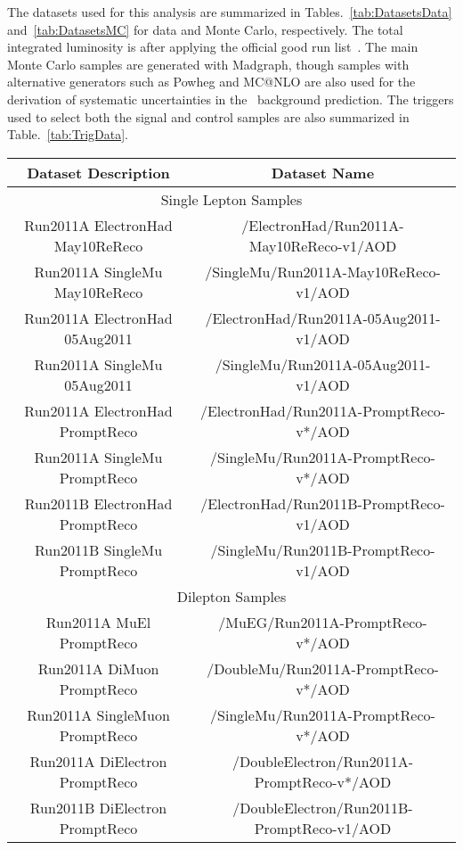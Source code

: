 
The datasets used for this analysis are summarized in 
Tables.~\ref{tab:DatasetsData} and~\ref{tab:DatasetsMC} for data and Monte 
Carlo, respectively. The total integrated luminosity is \lumi after
applying the official good run list~\cite{json}. The main Monte Carlo
samples are generated with Madgraph, though samples with
alternative generators such as Powheg and MC@NLO are also used for
the derivation of systematic uncertainties in the \ttbar~background prediction. 
The triggers used to select both the signal and control samples are
also summarized in Table.~\ref{tab:TrigData}.

\begin{table}[!ht]
\begin{center}
\begin{tabular}{c|c}
\hline
 Dataset Description                   &   Dataset Name   \\
\hline
\hline
\multicolumn{2}{c}{Single Lepton Samples} \\
\hline
Run2011A ElectronHad May10ReReco  & /ElectronHad/Run2011A-May10ReReco-v1/AOD \\
Run2011A SingleMu May10ReReco  & /SingleMu/Run2011A-May10ReReco-v1/AOD \\
Run2011A ElectronHad 05Aug2011  & /ElectronHad/Run2011A-05Aug2011-v1/AOD \\
Run2011A SingleMu 05Aug2011  & /SingleMu/Run2011A-05Aug2011-v1/AOD \\
Run2011A ElectronHad PromptReco  & /ElectronHad/Run2011A-PromptReco-v*/AOD \\
Run2011A SingleMu PromptReco  & /SingleMu/Run2011A-PromptReco-v*/AOD \\
Run2011B ElectronHad PromptReco  & /ElectronHad/Run2011B-PromptReco-v1/AOD \\
Run2011B SingleMu PromptReco  & /SingleMu/Run2011B-PromptReco-v1/AOD \\
\hline
\hline
\multicolumn{2}{c}{Dilepton Samples} \\
\hline
Run2011A MuEl PromptReco            &  /MuEG/Run2011A-PromptReco-v*/AOD   \\
Run2011A DiMuon PromptReco          &  /DoubleMu/Run2011A-PromptReco-v*/AOD   \\
Run2011A SingleMuon PromptReco      &  /SingleMu/Run2011A-PromptReco-v*/AOD   \\
Run2011A DiElectron PromptReco      &  /DoubleElectron/Run2011A-PromptReco-v*/AOD   \\
Run2011B DiElectron PromptReco      &  /DoubleElectron/Run2011B-PromptReco-v1/AOD   \\

\end{tabular}
\end{center}
\end{table}
